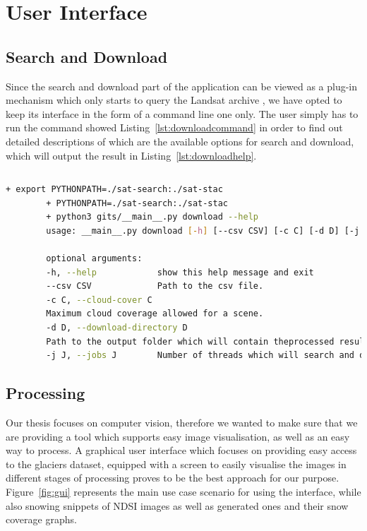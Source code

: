 \documentclass[12pt, a4paper]{report}
\begin{document}
	\vfill

	\chapter{User Interface}
	\label{seq:gui}
	
	\section{Search and Download}
	\label{subsec:search_download}
	
	\par Since the search and download part of the application can be viewed as a plug-in mechanism which only starts to query the Landsat archive , we have opted to keep its interface in the form of a command line one only. The user simply has to run the command showed Listing~\ref{lst:downloadcommand} in order to find out detailed descriptions of which are the available options for search and download, which will output the result in Listing~\ref{lst:downloadhelp}.
	
	\begin{lstlisting}[caption={Help command for sarch and download.},label={lst:downloadcommand},language=Bash]
		% bash -x run_download.sh --help
	\end{lstlisting}
	
	\begin{lstlisting}[caption={Detailed parameters required for the download script.},label={lst:downloadhelp},language=Bash]
		+ export PYTHONPATH=./sat-search:./sat-stac
		+ PYTHONPATH=./sat-search:./sat-stac
		+ python3 gits/__main__.py download --help
		usage: __main__.py download [-h] [--csv CSV] [-c C] [-d D] [-j J]
		
		optional arguments:
		-h, --help            show this help message and exit
		--csv CSV             Path to the csv file.
		-c C, --cloud-cover C
		Maximum cloud coverage allowed for a scene.
		-d D, --download-directory D
		Path to the output folder which will contain theprocessed results.
		-j J, --jobs J        Number of threads which will search and download.
	\end{lstlisting}

	\section{Processing}
	
	\par Our thesis focuses on computer vision, therefore we wanted to make sure that we are providing a tool which supports easy image visualisation, as well as an easy way to process. A graphical user interface which focuses on providing easy access to the glaciers dataset, equipped with a screen to easily visualise the images in different stages of processing proves to be the best approach for our purpose. Figure~\ref{fig:gui} represents the main use case scenario for using the interface, while also snowing snippets of NDSI images as well as generated ones and their snow coverage graphs.
	
\end{document}
